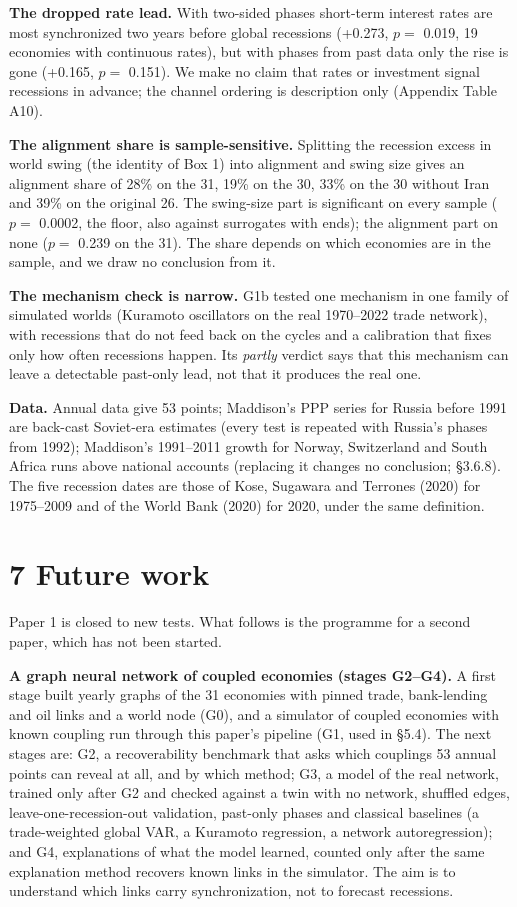 \documentclass[11pt,a4paper]{article}
\newcounter{none}                    %
\begin{document}
\textbf{The dropped rate lead.} With two-sided phases short-term interest rates are most synchronized two years before global recessions (+0.273, \(p =\) 0.019, 19 economies with continuous rates), but with phases from past data only the rise is gone (+0.165, \(p =\) 0.151). We make no claim that rates or investment signal recessions in advance; the channel ordering is description only (Appendix Table A10).

\textbf{The alignment share is sample-sensitive.} Splitting the recession excess in world swing (the identity of Box 1) into alignment and swing size gives an alignment share of 28\% on the 31, 19\% on the 30, 33\% on the 30 without Iran and 39\% on the original 26. The swing-size part is significant on every sample (\(p =\) 0.0002, the floor, also against surrogates with ends); the alignment part on none (\(p =\) 0.239 on the 31). The share depends on which economies are in the sample, and we draw no conclusion from it.

\textbf{The mechanism check is narrow.} G1b tested one mechanism in one family of simulated worlds (Kuramoto oscillators on the real 1970–2022 trade network), with recessions that do not feed back on the cycles and a calibration that fixes only how often recessions happen. Its \emph{partly} verdict says that this mechanism can leave a detectable past-only lead, not that it produces the real one.

\textbf{Data.} Annual data give 53 points; Maddison's PPP series for Russia before 1991 are back-cast Soviet-era estimates (every test is repeated with Russia's phases from 1992); Maddison's 1991–2011 growth for Norway, Switzerland and South Africa runs above national accounts (replacing it changes no conclusion; §3.6.8). The five recession dates are those of Kose, Sugawara and Terrones (2020) for 1975–2009 and of the World Bank (2020) for 2020, under the same definition.

\section{7 Future work}\label{future-work}

Paper 1 is closed to new tests. What follows is the programme for a second paper, which has not been started.

\textbf{A graph neural network of coupled economies (stages G2–G4).} A first stage built yearly graphs of the 31 economies with pinned trade, bank-lending and oil links and a world node (G0), and a simulator of coupled economies with known coupling run through this paper's pipeline (G1, used in §5.4). The next stages are: G2, a recoverability benchmark that asks which couplings 53 annual points can reveal at all, and by which method; G3, a model of the real network, trained only after G2 and checked against a twin with no network, shuffled edges, leave-one-recession-out validation, past-only phases and classical baselines (a trade-weighted global VAR, a Kuramoto regression, a network autoregression); and G4, explanations of what the model learned, counted only after the same explanation method recovers known links in the simulator. The aim is to understand which links carry synchronization, not to forecast recessions.
\end{document}
